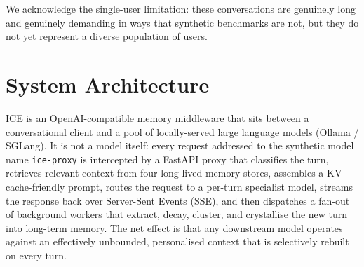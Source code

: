 \documentclass[10pt]{article}
\begin{document}
We acknowledge the single-user limitation: these conversations are genuinely long and genuinely demanding in ways that synthetic benchmarks are not, but they do not yet represent a diverse population of users.

\section{System Architecture}
\label{sec:architecture}

ICE is an OpenAI-compatible memory middleware that sits between a conversational client and a pool of locally-served large language models (Ollama / SGLang). It is not a model itself: every request addressed to the synthetic model name \texttt{ice-proxy} is intercepted by a FastAPI proxy that classifies the turn, retrieves relevant context from four long-lived memory stores, assembles a KV-cache-friendly prompt, routes the request to a per-turn specialist model, streams the response back over Server-Sent Events (SSE), and then dispatches a fan-out of background workers that extract, decay, cluster, and crystallise the new turn into long-term memory. The net effect is that any downstream model operates against an effectively unbounded, personalised context that is selectively rebuilt on every turn.
\end{document}
